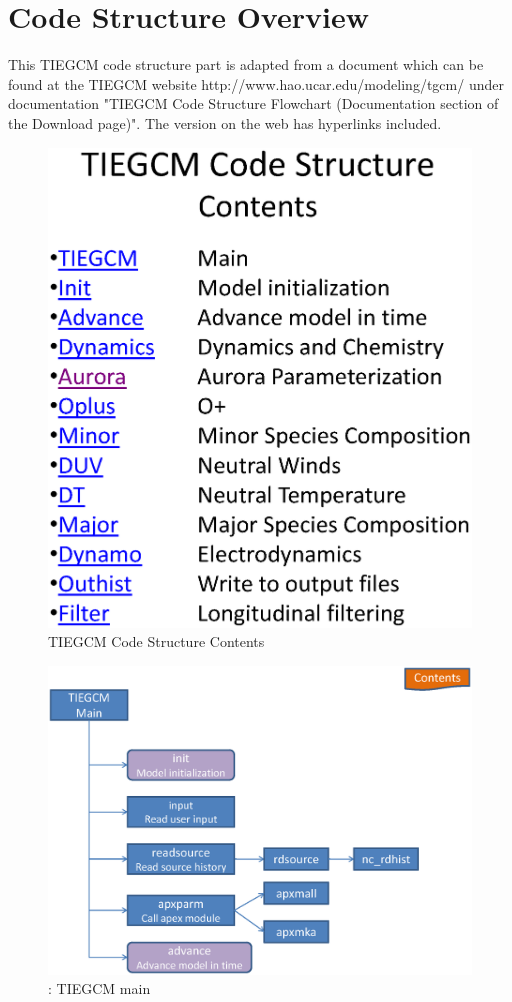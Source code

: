 \chapter{Code Structure Overview}
This TIEGCM code structure part is adapted from a document which can be found 
at the TIEGCM website http://www.hao.ucar.edu/modeling/tgcm/ under documentation
"TIEGCM Code Structure Flowchart (Documentation section of the Download page)".
The version on the web has hyperlinks included.
%
\begin{figure}
  \centering
  \includegraphics[scale=0.7,angle=-90.]{./tex_plot/code_1.ps}
  \caption{TIEGCM Code Structure
      Contents}
   \label{fig:code_1}
\end{figure}
%
\begin{figure}
  \centering
  \includegraphics[scale=0.7,angle=-90.]{./tex_plot/code_2.ps}
  \caption{: TIEGCM main}
   \label{fig:code_2}
\end{figure}
